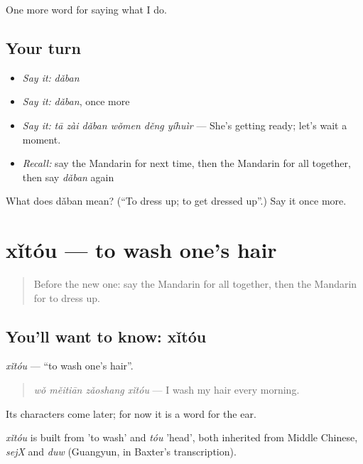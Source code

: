 \begin{grammarlens}[title={What you've built}]
One more word for saying what I do.
\end{grammarlens}

\subsection*{Your turn}
\begin{itemize}
\raggedright
  \item \emph{Say it:} \emph{dǎban}
  \item \emph{Say it:} \emph{dǎban}, once more
  \item \emph{Say it:} \emph{tā zài dǎban wǒmen děng yíhuìr} — She's getting ready; let's wait a moment.
  \item \emph{Recall:} say the Mandarin for next time, then the Mandarin for all together, then say \emph{dǎban} again
\end{itemize}

\begin{tcolorbox}[breakable,colback=teal!4,colframe=teal!35!black,title={Before you move on}]
What does dǎban mean? (\textquotedblleft{}To dress up; to get dressed up\textquotedblright{}.) Say it once more.
\end{tcolorbox}
\section[xǐtóu]{xǐtóu — to wash one's hair}

\label{lesson:ZH-C164-xitou}



\begin{quote}
Before the new one: say the Mandarin for all together, then the Mandarin for to dress up.
\end{quote}

\subsection*{You'll want to know: xǐtóu}
\emph{xǐtóu} — \textquotedblleft{}to wash one's hair\textquotedblright{}.

\begin{quote}
\emph{wǒ měitiān zǎoshang xǐtóu} — I wash my hair every morning.
\end{quote}

Its characters come later; for now it is a word for the ear.

\begin{cousinweb}
\emph{xǐtóu} is built from  'to wash' and \emph{tóu} 'head', both inherited from Middle Chinese, \emph{sejX} and \emph{duw} (Guangyun, in Baxter's transcription).
\end{cousinweb}

